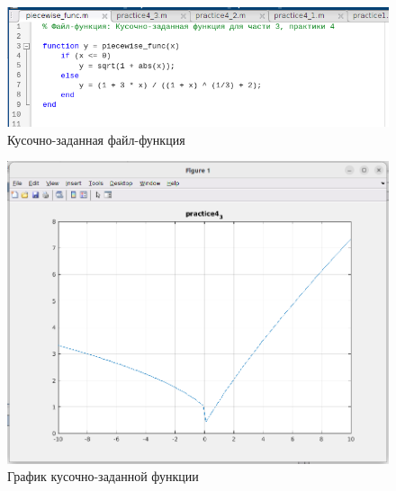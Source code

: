 \documentclass[12pt]{article}
\begin{document}
\begin{figure}[!h]
	\centering
	\includegraphics[width=\linewidth]{piecewise_func.png}
	\caption{Кусочно-заданная файл-функция}
\end{figure}

\begin{figure}[!h]
	\centering
	\includegraphics[width=\linewidth]{piecewise_plot.png}
	\caption{График кусочно-заданной функции}
\end{figure}
\end{document}

